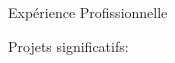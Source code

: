 \documentclass{resume}
\begin{document}
\begin{rSection}{Expérience Profissionnelle}
\begin{rSubsection}{Projets significatifs:}{}{}{}
    \end{rSubsection}

\end{rSection}
\end{document}

